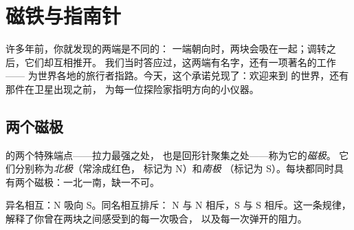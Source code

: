 \chapter{磁铁与指南针}\label{ch:g4:magnets-and-compass}

许多年前，你就发现的两端是不同的：
一端朝向时，两块会吸在一起；调转之后，它们却互相推开。
我们当时答应过，这两端有名字，还有一项著名的工作——
为世界各地的旅行者指路。今天，这个承诺兑现了：欢迎来到
的世界，还有那件在卫星出现之前，
为每一位探险家指明方向的小仪器。

\section{两个磁极}

\begin{definition}[磁极]\label{def:g4:magnets-and-compass:poles}
的两个特殊端点——拉力最强之处，
也是回形针聚集之处——称为它的\emph{磁极}。
它们分别称为\emph{北极}（常涂成红色，
标记为 N）和\emph{南极}
（标记为 S）。每块都同时具有两个磁极：一北一南，缺一不可。
\end{definition}

\begin{proposition}[磁极规律]\label{prop:g4:magnets-and-compass:rule}
异名相互：N 吸向 S。同名相互排斥：
N 与 N 相斥，S 与 S 相斥。这一条规律，
解释了你曾在两块之间感受到的每一次吸合，
以及每一次弹开的阻力。
\end{proposition}

